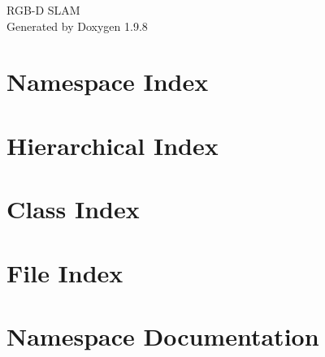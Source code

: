 \documentclass[twoside]{book}
\newcommand{\+}{\discretionary{\mbox{\scriptsize$\hookleftarrow$}}{}{}}
\newcommand{\clearemptydoublepage}{%
    \newpage{\pagestyle{empty}\cleardoublepage}%
  }
\begin{document}
  \raggedbottom
    \hypersetup{pageanchor=false,
                bookmarksnumbered=true,
                pdfencoding=unicode
               }
  \begin{titlepage}
  \vspace*{7cm}
  \begin{center}%
  {\Large RGB-\/\+D SLAM}\\
  \vspace*{1cm}
  {\large Generated by Doxygen 1.9.8}\\
  \end{center}
  \end{titlepage}
  \clearemptydoublepage
  \tableofcontents
  \clearemptydoublepage
  \hypersetup{pageanchor=true}



\chapter{Namespace Index}

\chapter{Hierarchical Index}

\chapter{Class Index}

\chapter{File Index}

\chapter{Namespace Documentation}




















\end{document}
